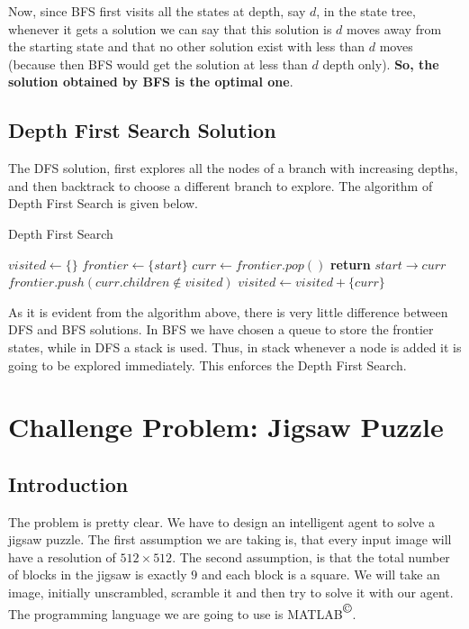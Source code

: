 \documentclass[journal, compsoc]{IEEEtran}
\begin{document}
Now, since BFS first visits all the states at depth, say $d$, in the state tree, whenever it gets a solution
we can say that this solution is $d$ moves away from the starting state and that no other solution exist with less than $d$
moves (because then BFS would get the solution at less than $d$ depth only). \textbf{So, the solution obtained by BFS is the optimal one}.

\subsection{Depth First Search Solution}

The DFS solution, first explores all the nodes of a branch with increasing depths, and then backtrack to choose a different
branch to explore. The algorithm of Depth First Search is given below.

\begin{algorithm}
\caption{Depth First Search}\label{BFSrabbit}
\begin{algorithmic}[1]
\State $visited \gets \{\}$
\State $frontier \gets \{start\}$ 
\State $curr \gets frontier.pop()$
\State \textbf{return} $start \rightarrow curr$
\EndIf
\State $frontier.push(curr.children \notin visited)$
\State $visited \gets visited + \{curr\}$
\EndWhile\label{bfsendwhile}
\EndProcedure
\end{algorithmic}
\end{algorithm}

As it is evident from the algorithm above, there is very little difference between DFS and BFS solutions. In BFS we have
chosen a queue to store the frontier states, while in DFS a stack is used. Thus, in stack whenever a node is added it is going
to be explored immediately. This enforces the Depth First Search.

\section{Challenge Problem: Jigsaw Puzzle}
\subsection{Introduction}

The problem is pretty clear. We have to design an intelligent agent to solve a jigsaw puzzle. The first assumption we are taking is, that
every input image will have a resolution of $512 \times 512$. The second assumption, is that the total number of blocks in the jigsaw is
exactly $9$ and each block is a square. We will take an image, initially unscrambled, scramble it and then try to solve it with our agent.
The programming language we are going to use is MATLAB\textsuperscript{$\copyright$}.
\end{document}
